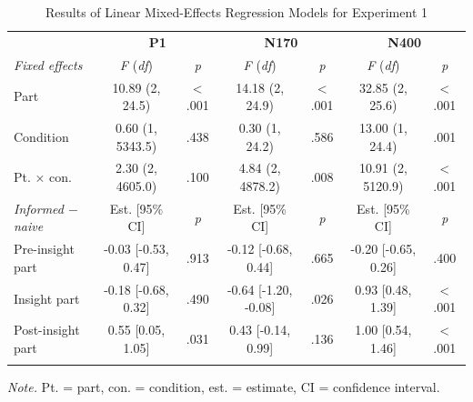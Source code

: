 \documentclass[
  english,
  doc,12pt,twoside,floatsintext]{apa7}
\begin{document}
\begin{table}[tbp]

\begin{center}
\begin{threeparttable}

\caption{\label{tab:exp1-table}Results of Linear Mixed-Effects Regression Models for Experiment 1\smallskip}

\footnotesize{

\begin{tabular}{lcccccc}
\toprule
 & \multicolumn{2}{c}{\textbf{P1}} & \multicolumn{2}{c}{\textbf{N170}} & \multicolumn{2}{c}{\textbf{N400}} \\
\cmidrule(r){2-3} \cmidrule(r){4-5} \cmidrule(r){6-7}
\textit{Fixed effects} & \textit{F} (\textit{df}) & \textit{p} & \textit{F} (\textit{df}) & \textit{p} & \textit{F} (\textit{df}) & \textit{p}\\
\midrule
Part & 10.89 (2, 24.5) & < .001 & 14.18 (2, 24.9) & < .001 & 32.85 (2, 25.6) & < .001\\
Condition & 0.60 (1, 5343.5) & .438 & 0.30 (1, 24.2) & .586 & 13.00 (1, 24.4) & .001\\
Pt. × con. & 2.30 (2, 4605.0) & .100 & 4.84 (2, 4878.2) & .008 & 10.91 (2, 5120.9) & < .001\\
\textit{Informed $-$  naive} & Est. [95\% CI] & \textit{p} & Est. [95\% CI] & \textit{p} & Est. [95\% CI] & \textit{p}\\ \midrule
Pre-insight part & -0.03 [-0.53, 0.47] & .913 & -0.12 [-0.68, 0.44] & .665 & -0.20 [-0.65, 0.26] & .400\\
Insight part & -0.18 [-0.68, 0.32] & .490 & -0.64 [-1.20, -0.08] & .026 & 0.93 [0.48, 1.39] & < .001\\
Post-insight part & 0.55 [0.05, 1.05] & .031 & 0.43 [-0.14, 0.99] & .136 & 1.00 [0.54, 1.46] & < .001\\
\bottomrule
\addlinespace
\end{tabular}

}

\begin{tablenotes}[para]
\normalsize{\textit{Note.} Pt. = part, con. = condition, est. = estimate, CI = confidence interval.}
\end{tablenotes}

\end{threeparttable}
\end{center}

\end{table}
\end{document}
